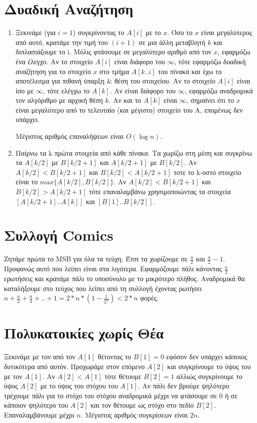 \documentclass[a4paper,10pt]{article} \usepackage{anysize}
\begin{document}
\section{Δυαδική Αναζήτηση}
\begin{enumerate}
\item Ξεκινάμε (για $i=1$) συγκρίνοντας το $A[i]$ με το $x$. Όσο το $x$ είναι
μεγαλύτερος από αυτό, κρατάμε την τιμή του $(i+1)$ σε μια άλλη μεταβλητή $k$ και
διπλασιάζουμε το i.
Μόλις φτάσουμε σε μεγαλύτερο αριθμό από τον $x$, εφαρμόζω ένα έλεγχο.
Αν το στοιχείο $A[i]$ είναι διάφορο του $\infty$, τότε εφαρμόζω δυαδική αναζήτηση
για το στοιχείο $x$ στο τμήμα $Α[k..i]$ του πίνακα και έχω το αποτέλεσμα για
πιθανή ύπαρξη \& θέση του στοιχείου.
Αν το στοιχείο $A[i]$ είναι ίσο με $\infty$, τότε ελέγχω το $A[k]$. Αν είναι
διάφορο του $\infty$, εφαρμόζω αναδρομικά τον αλγόριθμο με αρχική θέση $k$.
Αν και το $A[k]$ είναι $\infty$, σημαίνει ότι το $x$ είναι μεγαλύτερο από το
τελευταίο (και μέγιστο) στοιχείο του Α, επομένως δεν υπάρχει.

Μέγιστος αριθμός επαναλήψεων είναι $O(\log{n})$.

\item Παίρνω τα k πρώτα στοιχεία από κάθε πίνακα. Τα χωρίζω στη μέση και
συγκρίνω τα $A[k/2]$ με $B[k/2+1]$ και $A[k/2+1]$ με $B[k/2]$. Αν
$A[k/2]<B[k/2+1]$ και $B[k/2]<A[k/2+1]$ τοτε το k-οστό στοιχείο είναι το
$max\{A[k/2],B[k/2]\}$. Αν $A[k/2]<B[k/2+1]$ και $B[k/2]>A[k/2+1]$ τότε
επαναλαμβάνω χρησιμοποιώντας τα στοιχεία $[A[k/2+1]..A[k]]$ και
$[B[1]..B[k/2]]$.
\end{enumerate}

\section{Συλλογή Comics}
Ζητάμε πρώτα το MSB για όλα τα τεύχη. Έτσι τα χωρίζουμε σε $\frac{n}{2}$ και
$\frac{n}{2}-1$. Προφανώς αυτό που λείπει είναι στα λιγότερα. Εφαρμόζουμε πάλι
κάνοντας $\frac{n}{2}$ ερωτήσεις και κρατάμε πάλι το υποσύνολο με το μικρότερο
πλήθος. Αναδρομικά θα καταλήξουμε στο τεύχος που λείπει από τη συλλογή έχοντας
ρωτήσει $n+\frac{n}{2}+\frac{n}{4}+..+1=2*n*(1-\frac{1}{2^n}) < 2*n$ φορές.

\section{Πολυκατοικίες χωρίς Θέα}
Ξεκινάμε με τον από τον $A[1]$ θέτοντας το $B[1]=0$ εφόσον δεν υπάρχει κάποιος
δυτικότερα από αυτόν. Προχωράμε στον επόμενο $A[2]$ και συγκρίνουμε το ύψος
του με τον $A[1]$. Αν $A[2]<A[1]$ τότε θέτουμε $B[2]=1$ αλλιώς συγκρίνουμε το
ύψος $A[2]$ με το ύψος του στόχου του $A[1]$. Αν πάλι δεν βρούμε ψηλότερο
τρέχουμε πάλι για το στόχο του στόχου αναδρομικά μέχρι να φτάσουμε σε 0
ή σε κάποιον ψηλότερο του $A[2]$ και τον θέτουμε ως στόχο στο πεδίο $B[2]$.
Επαναλαμβάνουμε μέχρι $n$. Μέγιστος αριθμός συγκρίσεων είναι $2n$.
\end{document}
